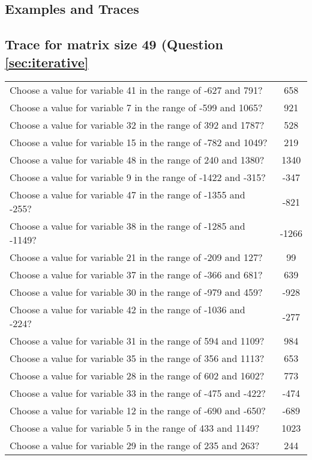 \documentclass[10pt,a4paper]{article}
\begin{document}
\begin{appendix}
\section{Examples and Traces}
\phantom{Easter Egg}
\subsection{Trace for matrix size 49 (Question \ref{sec:iterative}}
\label{sec:app:iterative}
\begin{tabular}{ l  c }
Choose a value for variable 41 in the range of -627 and 791? & 658
\\Choose a value for variable 7 in the range of -599 and 1065? & 921
\\Choose a value for variable 32 in the range of 392 and 1787? & 528
\\Choose a value for variable 15 in the range of -782 and 1049? & 219
\\Choose a value for variable 48 in the range of 240 and 1380? & 1340
\\Choose a value for variable 9 in the range of -1422 and -315? & -347
\\Choose a value for variable 47 in the range of -1355 and -255? & -821
\\Choose a value for variable 38 in the range of -1285 and -1149? & -1266
\\Choose a value for variable 21 in the range of -209 and 127? & 99
\\Choose a value for variable 37 in the range of -366 and 681? & 639
\\Choose a value for variable 30 in the range of -979 and 459? & -928
\\Choose a value for variable 42 in the range of -1036 and -224? & -277
\\Choose a value for variable 31 in the range of 594 and 1109? & 984
\\Choose a value for variable 35 in the range of 356 and 1113? & 653
\\Choose a value for variable 28 in the range of 602 and 1602? & 773
\\Choose a value for variable 33 in the range of -475 and -422? & -474
\\Choose a value for variable 12 in the range of -690 and -650? & -689
\\Choose a value for variable 5 in the range of 433 and 1149? & 1023
\\Choose a value for variable 29 in the range of 235 and 263? & 244

\end{tabular}
\end{appendix}
\end{document}
